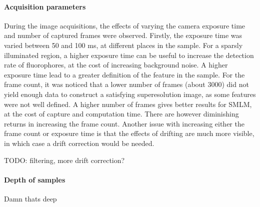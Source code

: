 \paragraph{Acquisition parameters}
During the image acquisitions, the effects of varying the camera exposure time and number of captured frames were observed. Firstly, the exposure time was varied between 50 and 100 ms, at different places in the sample. For a sparsly illuminated region, a higher exposure time can be useful to increase the detection rate of fluorophores, at the cost of increasing background noise. A higher exposure time lead to a greater definition of the feature in the sample. For the frame count, it was noticed that a lower number of frames (about 3000) did not yield enough data to construct a satisfying superesolution image, as some features were not well defined. A higher number of frames gives better results for SMLM, at the cost of capture and computation time. There are however diminishing returns in increasing the frame count. Another issue with increasing either the frame count or exposure time is that the effects of drifting are much more visible, in which case a drift correction would be needed.

TODO: filtering, more drift correction?

\paragraph{Depth of samples}
Damn thats deep